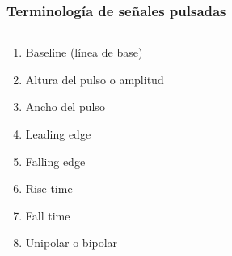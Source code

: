 \documentclass{beamer}
\begin{document}
\begin{frame}
\frametitle{Terminología de señales pulsadas}
\begin{columns}
\begin{column}{0.5\textwidth}
\begin{enumerate}
\item Baseline (línea de base)
\item Altura del pulso o amplitud
\item Ancho del pulso
\item Leading edge
\item Falling edge
\item Rise time
\item Fall time
\item Unipolar o bipolar
\end{enumerate}
\end{column}
\begin{column}{0.5\textwidth}
\begin{center}
\end{center}
\end{column}
\end{columns}
\end{frame}
\end{document}
